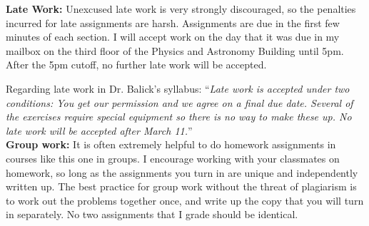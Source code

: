 \documentclass[12pt]{article}
\begin{document}
\noindent
{\bf Late Work: }
Unexcused late work is very strongly discouraged, so the penalties incurred for late assignments are harsh.
Assignments are due in the first few minutes of each section. I will accept work on the day that it was due 
in my mailbox on the third floor of the Physics and Astronomy Building until 5pm. After the 5pm cutoff,
no further late work will be accepted. 

Regarding late work in Dr. Balick's syllabus: ``\textit{Late work is accepted under two conditions: You get our permission and we agree on a final due date.  Several of the exercises require special equipment so there is no way to make these up. No late work will be accepted after March 11.}'' \\


\noindent
{\bf Group work: }
It is often extremely helpful to do homework assignments in courses like this one in groups. 
I encourage working with your classmates on homework, so long as the assignments you turn in
are unique and independently written up. The best practice for group work without the threat 
of plagiarism is to work out the problems together once, and write up the copy that you will
turn in separately. No two assignments that I grade should be identical.\\
\end{document}
